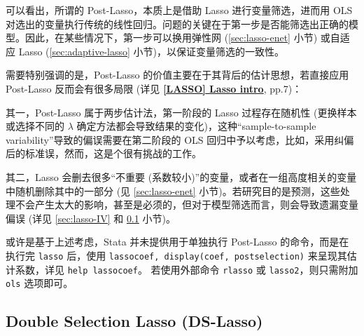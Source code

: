 可以看出，所谓的 Post-Lasso，本质上是借助 Lasso 进行变量筛选，进而用 OLS 对选出的变量执行传统的线性回归。问题的关键在于第一步是否能筛选出正确的模型。因此，在某些情况下，第一步可以换用弹性网 (\ref{sec:lasso-enet} 小节) 或自适应 Lasso (\ref{sec:adaptive-lasso} 小节)，以保证变量筛选的一致性。

需要特别强调的是，Post-Lasso 的价值主要在于其背后的估计思想，若直接应用 Post-Lasso 反而会有很多局限 (详见 \href{https://www.stata.com/manuals/lassoLasso intro.pdf}{\bfseries{[\MakeUppercase{lasso}] Lasso intro}}, pp.7)：

其一，Post-Lasso 属于两步估计法，第一阶段的 Lasso 过程存在随机性 (更换样本或选择不同的 $\lambda$ 确定方法都会导致结果的变化)，这种“sample-to-sample
variability”导致的偏误需要在第二阶段的 OLS 回归中予以考虑，比如，采用纠偏后的标准误，然而，这是个很有挑战的工作。

其二，Lasso 会删去很多“不重要 (系数较小)”的变量，或者在一组高度相关的变量中随机删除其中的一部分 (见 \ref{sec:lasso-enet} 小节)。若研究目的是预测，这些处理不会产生太大的影响，甚至是必须的，但对于模型筛选而言，则会导致遗漏变量偏误 (详见 \ref{sec:lasso-IV} 和 \ref{sec:lasso-DSL} 小节)。

或许是基于上述考虑，Stata 并未提供用于单独执行 Post-Lasso 的命令，而是在执行完 \texttt{lasso} 后，使用 \texttt{lassocoef, display(coef, postselection)} 来呈现其估计系数，详见 \texttt{help lassocoef}。
若使用外部命令 \texttt{rlasso} 或 \texttt{lasso2}，则只需附加 \texttt{ols} 选项即可。 





\subsection{Double Selection Lasso (DS-Lasso)}\label{sec:lasso-DSL}


